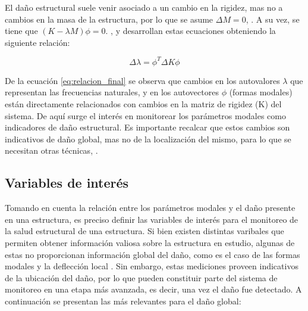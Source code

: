 El daño estructural suele venir asociado a un cambio en la rigidez, mas no a cambios en la masa de la estructura, por lo que se asume $\Delta M = 0$, \citep{hearn1991modal}. A su vez, se tiene que $(K - \lambda M)\phi = 0$. \citet{mohamed2014}, \citet{shi1998structural} y \citet{hearn1991modal} desarrollan estas ecuaciones obteniendo la siguiente relación:

\begin{equation} \label{eq:relacion_final}
    \Delta\lambda = \phi^T \Delta K \phi
\end{equation}

De la ecuación \ref{eq:relacion_final} se observa que cambios en los autovalores $\lambda$ que representan las frecuencias naturales, y en los autovectores $\phi$ (formas modales) están directamente relacionados con cambios en la matriz de rigidez (K) del sistema. De aquí surge el interés en monitorear los parámetros modales como indicadores de daño estructural. Es importante recalcar que estos cambios son indicativos de daño global, mas no de la localización del mismo, para lo que se necesitan otras técnicas, \citep{mohamed2014}.

\subsection{Variables de interés}

Tomando en cuenta la relación entre los parámetros modales y el daño presente en una estructura, es preciso definir las variables de interés para el monitoreo de la salud estructural de una estructura. Si bien existen distintas varibales que permiten obtener información valiosa sobre la estructura en estudio, algunas de estas no proporcionan información global del daño, como es el caso de las formas modales y la deflección local \citep{rytter1993vibration}. Sin embargo, estas mediciones proveen indicativos de la ubicación del daño, por lo que pueden constituir parte del sistema de monitoreo en una etapa más avanzada, es decir, una vez el daño fue detectado. A continuación se presentan las más relevantes para el daño global:

